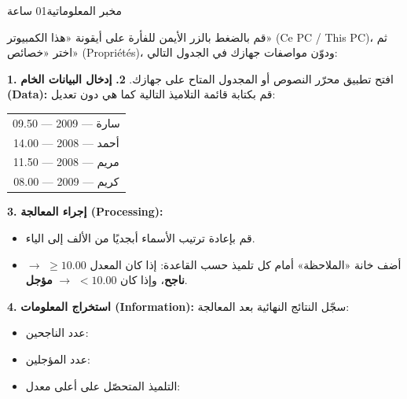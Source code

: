 \documentclass[11pt, a4paper]{article}
\begin{document}
\officialheader

           {مخبر المعلوماتية}{01 ساعة}

\studentid


\begin{activitybox}[التعليمات]
  قم بالضغط بالزر الأيمن للفأرة على أيقونة «هذا الكمبيوتر» (Ce PC / This PC)، ثم اختر «خصائص» (Propriétés)، ودوّن مواصفات جهازك في الجدول التالي:
  \vspace{4pt}
  \specheader
  \specend
\end{activitybox}


\begin{activitybox}[التعليمات]
  \textbf{1.} افتح تطبيق محرّر النصوص أو المجدول المتاح على جهازك.\newline
  \textbf{2.} \textbf{إدخال البيانات الخام (Data):} قم بكتابة قائمة التلاميذ التالية كما هي دون تعديل:
  \begin{center}
  \begin{tabular}{@{}c@{}}
    سارة — 2009 — 09.50 \\
    أحمد — 2008 — 14.00 \\
    مريم — 2008 — 11.50 \\
    كريم — 2009 — 08.00 \\
  \end{tabular}
  \end{center}
  \textbf{3.} \textbf{إجراء المعالجة (Processing):}
  \begin{itemize}[label=\textbullet, leftmargin=1.1em, itemsep=1pt, topsep=2pt, parsep=0pt]
    \item قم بإعادة ترتيب الأسماء أبجديًا من الألف إلى الياء.
    \item أضف خانة «الملاحظة» أمام كل تلميذ حسب القاعدة: إذا كان المعدل $\ge 10.00$ $\rightarrow$ \textbf{ناجح}، وإذا كان $< 10.00$ $\rightarrow$ \textbf{مؤجل}.
  \end{itemize}
  \textbf{4.} \textbf{استخراج المعلومات (Information):} سجّل النتائج النهائية بعد المعالجة:
  \begin{itemize}[label=\textbullet, leftmargin=1.1em, itemsep=3pt, topsep=2pt, parsep=0pt]
    \item عدد الناجحين: \blank[2.2cm]
    \item عدد المؤجلين: \blank[2.2cm]
    \item التلميذ المتحصّل على أعلى معدل: \blank[5cm]
  \end{itemize}
\end{activitybox}
\end{document}
